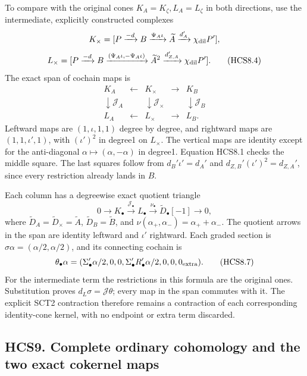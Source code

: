 To compare with the original cones \(K_A=K_\zeta,L_A=L_\zeta\) in both
directions, use the intermediate, explicitly constructed complexes \[
K_\times=[P\xrightarrow{-d}B\xrightarrow{\Psi_A\iota}
\widetilde A\xrightarrow{d_A'}\chi_{\rm dil}P'],
\] \[
L_\times=[P\xrightarrow{-d}B
\xrightarrow{(\Psi_A\iota,-\Psi_A\iota)}
\widetilde A^2\xrightarrow{d_{Z,A}'}
\chi_{\rm dil}P'].
\tag{HCS8.4}
\] The exact span of cochain maps is \[
\begin{array}{ccccc}
K_A&\longleftarrow&K_\times&\longrightarrow&K_B\\
\downarrow\mathcal J_A&&\downarrow\mathcal J_\times&&
\downarrow\mathcal J_B\\
L_A&\longleftarrow&L_\times&\longrightarrow&L_B .
\end{array}
\tag{HCS8.5}
\] Leftward maps are \((1,\iota,1,1)\) degree by degree, and rightward
maps are \((1,1,\iota',1)\), with \((\iota')^2\) in degree1 on
\(L_\times\). The vertical maps are identity except for the
anti-diagonal \(\alpha\mapsto(\alpha,-\alpha)\) in degree1. Equation
HCS8.1 checks the middle square. The last squares follow from
\(d_B'\iota'=d_A'\) and \(d_{Z,B}'(\iota')^2=d_{Z,A}'\), since every
restriction already lands in \(B\).

Each column has a degreewise exact quotient triangle \[
0\to K_\bullet\xrightarrow{\mathcal J_\bullet}L_\bullet
\xrightarrow{\nu_\bullet}\widetilde D_\bullet[-1]\to0,
\tag{HCS8.6}
\] where \(\widetilde D_A=\widetilde D_\times=\widetilde A\),
\(\widetilde D_B=\widetilde B\), and
\(\nu(\alpha_+,\alpha_-)=\alpha_++\alpha_-\). The quotient arrows in the
span are identity leftward and \(\iota'\) rightward. Each graded section
is \(\sigma\alpha=(\alpha/2,\alpha/2)\), and its connecting cochain is
\[
\theta_\bullet\alpha=
(\Sigma_\bullet'\alpha/2,0,0,
\Sigma_\bullet'R_\bullet'\alpha/2,0,0,0_{\rm extra}).
\tag{HCS8.7}
\] For the intermediate term the restrictions in this formula are the
original ones. Substitution proves \(d_L\sigma=\mathcal J\theta\); every
map in the span commutes with it. The explicit SCT2 contraction
therefore remains a contraction of each corresponding identity-cone
kernel, with no endpoint or extra term discarded.

\subsection{HCS9. Complete ordinary cohomology and the two exact
cokernel
maps}\label{hcs9.-complete-ordinary-cohomology-and-the-two-exact-cokernel-maps}

